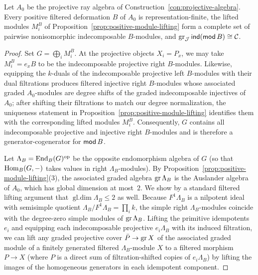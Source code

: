 \begin{corollary}
\label{cor:positive-deformation-completeness}
Let $A_0$ be the projective ray algebra of Construction~\ref{con:projective-algebra}. Every positive filtered deformation $B$ of $A_0$ is representation-finite, the lifted modules $M_i^B$ of Proposition~\ref{prop:positive-module-lifting} form a complete set of pairwise nonisomorphic indecomposable $B$-modules, and $\operatorname{gr}_\mathcal J\operatorname{\mathsf{ind}}(\operatorname{\mathsf{mod}} B)\cong\mathcal C$.
\end{corollary}
\begin{proof}
Set $G=\bigoplus_i M_i^B$. At the projective objects $X_i=P_x$, we may take $M_i^B=e_xB$ to be the indecomposable projective right $B$-modules. Likewise, equipping the $k$-duals of the indecomposable projective left $B$-modules with their dual filtrations produces filtered injective right $B$-modules whose associated graded $A_0$-modules are degree shifts of the graded indecomposable injectives of $A_0$; after shifting their filtrations to match our degree normalization, the uniqueness statement in Proposition~\ref{prop:positive-module-lifting} identifies them with the corresponding lifted modules $M_i^B$. Consequently, $G$ contains all indecomposable projective and injective right $B$-modules and is therefore a generator-cogenerator for $\operatorname{\mathsf{mod}} B$.

Let $\Lambda_B=\operatorname{End}_B(G)^{\mathrm{op}}$ be the opposite endomorphism algebra of $G$ (so that $\operatorname{Hom}_B(G,-)$ takes values in right $\Lambda_B$-modules). By Proposition~\ref{prop:positive-module-lifting}(3), the associated graded algebra $\operatorname{gr}\Lambda_B$ is the Auslander algebra of $A_0$, which has global dimension at most~$2$. We show by a standard filtered lifting argument that $\operatorname{gl.dim}\Lambda_B\leq2$ as well. Because $F^1\Lambda_B$ is a nilpotent ideal with semisimple quotient $\Lambda_B/F^1\Lambda_B=\prod_i k$, the simple right $\Lambda_B$-modules coincide with the degree-zero simple modules of $\operatorname{gr}\Lambda_B$. Lifting the primitive idempotents $e_i$ and equipping each indecomposable projective $e_i\Lambda_B$ with its induced filtration, we can lift any graded projective cover $\bar P\to\operatorname{gr} X$ of the associated graded module of a finitely generated filtered $\Lambda_B$-module $X$ to a filtered morphism $P\to X$ (where $P$ is a direct sum of filtration-shifted copies of $e_i\Lambda_B$) by lifting the images of the homogeneous generators in each idempotent component.


\end{proof}
